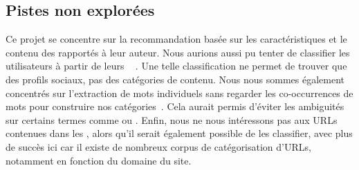 \subsection{Pistes non explorées} \label{sec:pistes}

Ce projet se concentre sur la recommandation basée sur les caractéristiques et
le contenu des \tweets{} rapportés à leur auteur. Nous aurions aussi pu tenter
de classifier les utilisateurs à partir de leurs \tweets~
\citep{Pennacchiotti11}. Une telle classification ne permet de trouver que des
profils sociaux, pas des catégories de contenu. Nous nous sommes également
concentrés sur l’extraction de mots individuels sans regarder les
co-occurrences de mots pour construire nos
catégories~\citep{Ramage2010,Rigouste06}. Cela aurait permis d’éviter les
ambiguités sur certains termes comme  ou . Enfin, nous ne
nous intéressons pas aux URLs contenues dans les \tweets{}, alors qu’il serait
également possible de les classifier, avec plus de succès ici car il existe de
nombreux corpus de catégorisation d’URLs, notamment en fonction du domaine du
site.
